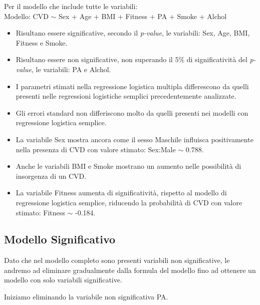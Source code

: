 \documentclass{article}\usepackage[]{graphicx}\usepackage[]{xcolor}
\begin{document}
    Per il modello che include tutte le variabili:\\
    Modello: CVD $\sim$ Sex + Age + BMI + Fitness + PA + Smoke + Alchol 
    \begin{itemize}
      \item Risultano essere significative, secondo il \emph{p-value}, le 
            variabili: Sex, Age, BMI, Fitness e Smoke.
      \item Risultano essere non significative, non superando il $5\%$
            di significatività del \emph{p-value}, le variabili: PA e Alchol.
      \item I parametri stimati nella regressione logistica multipla differescono da             quelli presenti nelle regressioni logistiche semplici precedentemente               analizzate.
      \item Gli errori standard non differiscono molto da quelli presenti nei                   modelli con regressione logistica semplice.
      \item La variabile Sex mostra ancora come il sesso Maschile influisca 
            positivamente nella presenza di CVD con valore stimato: 
            Sex:Male $\sim$ 0.788.
      \item Anche le variabili BMI e Smoke mostrano un aumento nelle possibilità 
            di insorgenza di un CVD.
      \item La variabile Fitness aumenta di significatività, rispetto
            al modello di regressione logistica semplice, riducendo la 
            probabilità di CVD con valore stimato: Fitness $\sim$ -0.184.
    \end{itemize}
  
  \subsection{Modello Significativo}
    Dato che nel modello completo sono presenti variabili non significative,
    le andremo ad eliminare gradualmente dalla formula del modello fino ad 
    ottenere un modello con solo variabili significative.\par
    Iniziamo eliminando la variabile non significativa PA.
    
\end{document}
